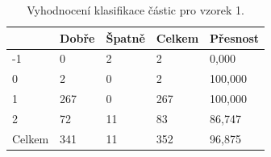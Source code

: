 \documentclass[11pt,twoside,a4paper,table]{book}
\begin{document}
\begin{table}[h!]
\begin{center}
\begin{tabular}{lllll}
\hline
\rowcolor[HTML]{9B9B9B} 
\multicolumn{1}{|l|}{\cellcolor[HTML]{9B9B9B}Třída} & \multicolumn{1}{l|}{\cellcolor[HTML]{9B9B9B}Dobře} & \multicolumn{1}{l|}{\cellcolor[HTML]{9B9B9B}Špatně} & \multicolumn{1}{l|}{\cellcolor[HTML]{9B9B9B}Celkem} & \multicolumn{1}{l|}{\cellcolor[HTML]{9B9B9B}Přesnost} \\ \hline
\multicolumn{1}{|l|}{-1}                            & \multicolumn{1}{l|}{0}                             & \multicolumn{1}{l|}{2}                               & \multicolumn{1}{l|}{2}                              & \multicolumn{1}{l|}{0,000}                            \\ \hline
\multicolumn{1}{|l|}{0}                             & \multicolumn{1}{l|}{2}                             & \multicolumn{1}{l|}{0}                               & \multicolumn{1}{l|}{2}                              & \multicolumn{1}{l|}{100,000}                          \\ \hline
\multicolumn{1}{|l|}{1}                             & \multicolumn{1}{l|}{267}                           & \multicolumn{1}{l|}{0}                               & \multicolumn{1}{l|}{267}                            & \multicolumn{1}{l|}{100,000}                          \\ \hline
\multicolumn{1}{|l|}{2}                             & \multicolumn{1}{l|}{72}                            & \multicolumn{1}{l|}{11}                              & \multicolumn{1}{l|}{83}                             & \multicolumn{1}{l|}{86,747}                           \\ \hline
\multicolumn{1}{|l|}{Celkem}                        & \multicolumn{1}{l|}{341}                           & \multicolumn{1}{l|}{11}                              & \multicolumn{1}{l|}{352}                            & \multicolumn{1}{l|}{96,875}                           \\ \hline
\end{tabular}
\end{center}
\caption{Vyhodnocení klasifikace částic pro vzorek 1.}
\label{tab:classresult1}
\end{table}

\FloatBarrier
\end{document}
